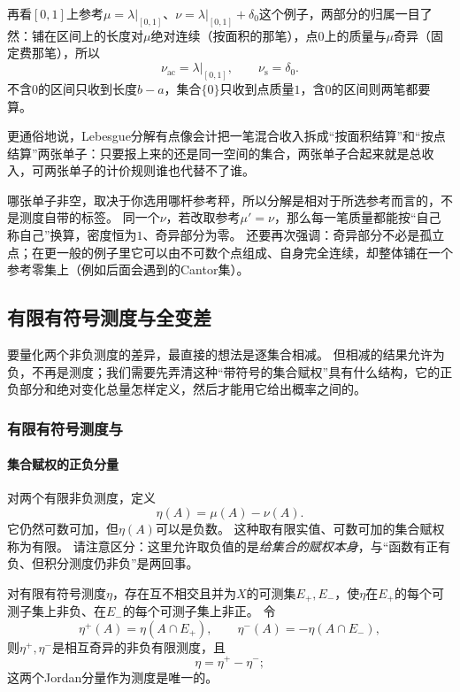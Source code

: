 再看$[0,1]$上参考$\mu=\lambda|_{[0,1]}$、$\nu=\lambda|_{[0,1]}+\delta_0$这个例子，两部分的归属一目了然：铺在区间上的长度对$\mu$绝对连续（按面积的那笔），点$0$上的质量与$\mu$奇异（固定费那笔），所以
\[
 \nu_{\mathrm{ac}}=\lambda|_{[0,1]},\qquad \nu_{\mathrm s}=\delta_0.
\]
不含$0$的区间只收到长度$b-a$，集合$\{0\}$只收到点质量$1$，含$0$的区间则两笔都要算。

更通俗地说，Lebesgue分解有点像会计把一笔混合收入拆成“按面积结算”和“按点结算”两张单子：只要报上来的还是同一空间的集合，两张单子合起来就是总收入，可两张单子的计价规则谁也代替不了谁。

哪张单子非空，取决于你选用哪杆参考秤，所以分解是相对于所选参考而言的，不是测度自带的标签。
同一个$\nu$，若改取参考$\mu'=\nu$，那么每一笔质量都能按“自己称自己”换算，密度恒为$1$、奇异部分为零。
还要再次强调：奇异部分不必是孤立点；在更一般的例子里它可以由不可数个点组成、自身完全连续，却整体铺在一个参考零集上（例如后面会遇到的Cantor集）。

\subsection{有限有符号测度与全变差}

要量化两个非负测度的差异，最直接的想法是逐集合相减。
但相减的结果允许为负，不再是测度；我们需要先弄清这种“带符号的集合赋权”具有什么结构，它的正负部分和绝对变化总量怎样定义，然后才能用它给出概率之间的。

\subsubsection{有限有符号测度与}
\label{sec:measure-signed-total-variation}

\paragraph{集合赋权的正负分量}

对两个有限非负测度，定义
\[
 \eta(A)=\mu(A)-\nu(A).
\]
它仍然可数可加，但$\eta(A)$可以是负数。
这种取有限实值、可数可加的集合赋权称为有限。
请注意区分：这里允许取负值的是\emph{给集合的赋权本身}，与“函数有正有负、但积分测度仍非负”是两回事。

\begin{theorem}
\label{thm:measure-hahn-jordan}
对有限有符号测度$\eta$，存在互不相交且并为$X$的可测集$E_+,E_-$，使$\eta$在$E_+$的每个可测子集上非负、在$E_-$的每个可测子集上非正。
令
\[
 \eta^+(A)=\eta(A\cap E_+),\qquad
 \eta^-(A)=-\eta(A\cap E_-),
\]
则$\eta^+,\eta^-$是相互奇异的非负有限测度，且
\[
 \eta=\eta^+-\eta^-;
\]
这两个Jordan分量作为测度是唯一的。
\end{theorem}

